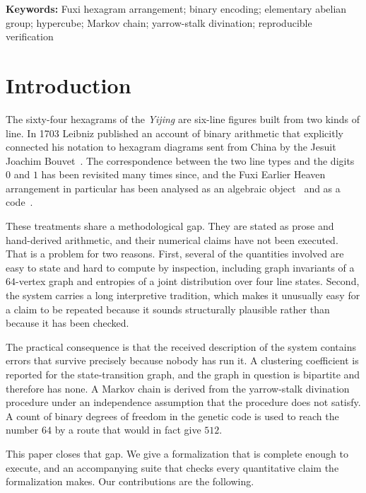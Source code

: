 \documentclass[11pt,a4paper]{article}
\begin{document}
\noindent\textbf{Keywords:} Fuxi hexagram arrangement; binary encoding;
elementary abelian group; hypercube; Markov chain; yarrow-stalk divination;
reproducible verification

\section{Introduction}

The sixty-four hexagrams of the \emph{Yijing} are six-line figures built from two
kinds of line. In 1703 Leibniz published an account of binary arithmetic that
explicitly connected his notation to hexagram diagrams sent from China by the
Jesuit Joachim Bouvet~\cite{aiton1981gorai}. The correspondence between the two
line types and the digits $0$ and $1$ has been revisited many times since, and
the Fuxi Earlier Heaven arrangement in particular has been analysed as an
algebraic object~\cite{goldenberg1975algebra,schoter1998boolean,schoter2008bipolar}
and as a code~\cite{hayata2012coding}.

These treatments share a methodological gap. They are stated as prose and
hand-derived arithmetic, and their numerical claims have not been executed. That
is a problem for two reasons. First, several of the quantities involved are easy
to state and hard to compute by inspection, including graph invariants of a
$64$-vertex graph and entropies of a joint distribution over four line states.
Second, the system carries a long interpretive tradition, which makes it
unusually easy for a claim to be repeated because it sounds structurally
plausible rather than because it has been checked.

The practical consequence is that the received description of the system
contains errors that survive precisely because nobody has run it. A clustering
coefficient is reported for the state-transition graph, and the graph in
question is bipartite and therefore has none. A Markov chain is derived from the
yarrow-stalk divination procedure under an independence assumption that the
procedure does not satisfy. A count of binary degrees of freedom in the genetic
code is used to reach the number $64$ by a route that would in fact give $512$.

This paper closes that gap. We give a formalization that is complete enough to
execute, and an accompanying suite that checks every quantitative claim the
formalization makes. Our contributions are the following.
\end{document}
